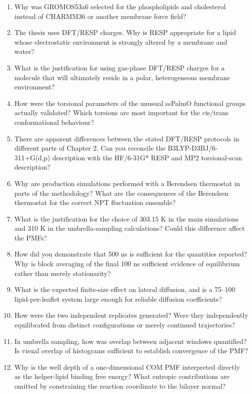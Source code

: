\documentclass[11pt,a4paper]{article}
\begin{document}
\begin{enumerate}[leftmargin=*]
\item Why was GROMOS53a6 selected for the phospholipids and cholesterol instead of CHARMM36 or another membrane force field?
\item The thesis uses DFT/RESP charges. Why is RESP appropriate for a lipid whose electrostatic environment is strongly altered by a membrane and water?
\item What is the justification for using gas-phase DFT/RESP charges for a molecule that will ultimately reside in a polar, heterogeneous membrane environment?
\item How were the torsional parameters of the unusual ssPalmO functional groups actually validated? Which torsions are most important for the cis/trans conformational behaviour?
\item There are apparent differences between the stated DFT/RESP protocols in different parts of Chapter 2. Can you reconcile the B3LYP-D3BJ/6-311+G(d,p) description with the HF/6-31G* RESP and MP2 torsional-scan description?
\item Why are production simulations performed with a Berendsen thermostat in parts of the methodology? What are the consequences of the Berendsen thermostat for the correct NPT fluctuation ensemble?
\item What is the justification for the choice of 303.15 K in the main simulations and 310 K in the umbrella-sampling calculations? Could this difference affect the PMFs?
\item How did you demonstrate that 500 ns is sufficient for the quantities reported? Why is block averaging of the final 100 ns sufficient evidence of equilibrium rather than merely stationarity?
\item What is the expected finite-size effect on lateral diffusion, and is a 75--100 lipid-per-leaflet system large enough for reliable diffusion coefficients?
\item How were the two independent replicates generated? Were they independently equilibrated from distinct configurations or merely continued trajectories?
\item In umbrella sampling, how was overlap between adjacent windows quantified? Is visual overlap of histograms sufficient to establish convergence of the PMF?
\item Why is the well depth of a one-dimensional COM PMF interpreted directly as the helper-lipid binding free energy? What entropic contributions are omitted by constraining the reaction coordinate to the bilayer normal?
\end{enumerate}
\end{document}
